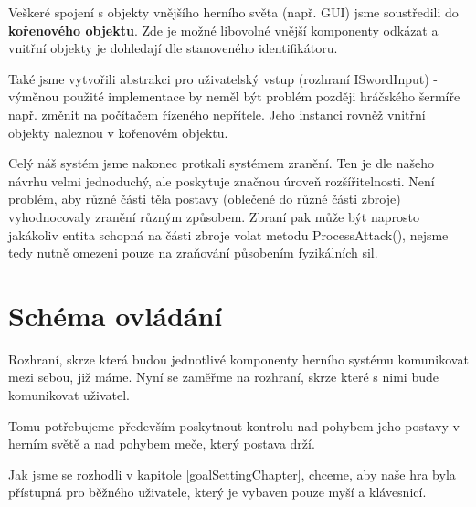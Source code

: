 Veškeré spojení s objekty vnějšího herního světa (např. GUI) jsme soustředili do \textbf{kořenového objektu}. Zde je možné libovolné vnější komponenty odkázat a vnitřní objekty je dohledají dle stanoveného identifikátoru.

Také jsme vytvořili abstrakci pro uživatelský vstup (rozhraní ISwordInput) - výměnou použité implementace by neměl být problém později hráčského šermíře např. změnit na počítačem řízeného nepřítele. Jeho instanci rovněž vnitřní objekty naleznou v kořenovém objektu. 

Celý náš systém jsme nakonec protkali systémem zranění. Ten je dle našeho návrhu velmi jednoduchý, ale poskytuje značnou úroveň rozšířitelnosti. Není problém, aby různé části těla postavy (oblečené do různé části zbroje) vyhodnocovaly zranění různým způsobem. Zbraní pak může být naprosto jakákoliv entita schopná na části zbroje volat metodu ProcessAttack(), nejsme tedy nutně omezeni pouze na zraňování působením fyzikálních sil.





\section{Schéma ovládání} 

Rozhraní, skrze která budou jednotlivé komponenty herního systému komunikovat mezi sebou, již máme. Nyní se zaměřme na rozhraní, skrze které s nimi bude komunikovat uživatel.

Tomu potřebujeme především poskytnout kontrolu nad pohybem jeho postavy v herním světě a nad pohybem meče, který postava drží.

Jak jsme se rozhodli v kapitole \ref{goalSettingChapter}, chceme, aby naše hra byla přístupná pro běžného uživatele, který je vybaven pouze myší a klávesnicí.

